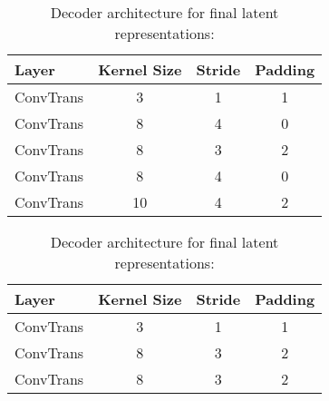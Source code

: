 
\begin{table}[htbp]
	\centering
	\renewcommand{\arraystretch}{1.2} %
	\begin{minipage}{0.45\textwidth}
		\centering
		\begin{tabular}{|l|c|c|c|}
			\hline
			\textbf{Layer} & \textbf{Kernel Size} & \textbf{Stride} & \textbf{Padding} \\ \hline
			ConvTrans         & 3                    & 1               & 1                \\ \hline
			ConvTrans         & 8					  & 4				& 0					\\ \hline
			ConvTrans         & 8                    & 3               & 2                \\ \hline
			ConvTrans         & 8					  & 4				& 0					\\ \hline
			ConvTrans         & 10                   & 4               & 2                \\ \hline
		\end{tabular}
		\caption{Decoder architecture for intermediate latent representations. %
		}
		\label{tab:decoder-architecure-intermidate}
	\end{minipage}
	\hfill
	\begin{minipage}{0.45\textwidth}
		\centering
		\begin{tabular}{|l|c|c|c|}
			\hline
			\textbf{Layer} & \textbf{Kernel Size} & \textbf{Stride} & \textbf{Padding} \\ \hline
			ConvTrans         & 3                    & 1               & 1                \\ \hline
			ConvTrans         & 8                    & 3               & 2                \\ \hline
			ConvTrans         & 8                    & 3               & 2                \\ \hline
		\end{tabular}
		\caption{Decoder architecture for final latent representations: %
		}
		\label{tab:decoder-architecure-final}
	\end{minipage}
\end{table}



%
